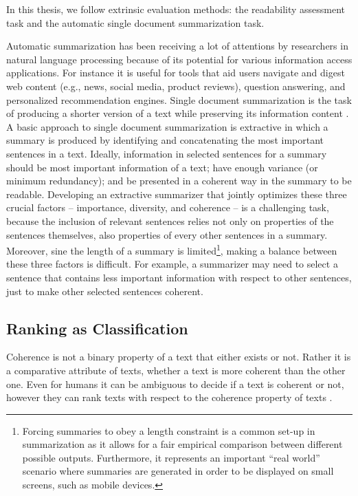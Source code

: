 In this thesis, we follow extrinsic evaluation methods: the readability assessment task and the automatic single document summarization task.  

Automatic summarization has been receiving a lot of attentions by researchers in natural language processing because of its potential for various information access applications. 
For instance it is useful for tools that aid users navigate and digest web content (e.g., news, social media, product reviews), question answering, and personalized recommendation engines. 
Single document summarization is the task of producing a shorter version of a text while preserving its information content \cite{nenkova11}. 
A basic approach to single document summarization is extractive in which a summary is produced by identifying and concatenating the most important sentences in a text. 
Ideally, information in selected sentences for a summary should be most important information of a text; have enough variance (or minimum redundancy); and be presented in a coherent way in the summary to be readable. 
Developing an extractive summarizer that jointly optimizes these three crucial factors -- importance, diversity, and coherence -- is a challenging task, because the inclusion of relevant sentences relies not only on properties of the sentences themselves, also properties of every other sentences in a summary. 
Moreover, sine the length of a summary is limited\footnote{Forcing summaries to obey a length constraint is a common set-up in summarization as it allows for a fair empirical comparison between different possible outputs. 
 Furthermore, it represents an important ``real world'' scenario where summaries are generated in order to be displayed on small screens, such as mobile devices.
}, making a balance between these three factors is difficult. 
For example, a summarizer may need to select a sentence that contains less important information with respect to other sentences, just to make other selected sentences coherent. 



\subsection{Ranking as Classification} 

Coherence is not a binary property of a text that either exists or not. 
Rather it is a comparative attribute of texts, whether a text is more coherent than the other one. 
Even for humans it can be ambiguous to decide if a text is coherent or not, however they can rank texts with respect to the coherence property of texts \cite{halliday76}.   

